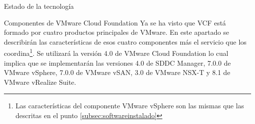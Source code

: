 \begin{section}{Estado de la tecnología}
\begin{subsection}{Componentes de VMware Cloud Foundation \cite{componentesCloudFound}}
Ya se ha visto que VCF está formado por cuatro productos principales de VMware. En este apartado se describirán las características de esos cuatro componentes más el servicio que los coordina\footnote{Las características del componente VMware vSphere son las mismas que las descritas en el punto \ref*{subsec:softwareinstalado}}. Se utilizará la versión 4.0 de VMware Cloud Foundation lo cual implica que se implementarán las versiones 4.0 de SDDC Manager, 7.0.0 de VMware vSphere, 7.0.0 de VMware vSAN, 3.0 de VMware NSX-T y 8.1 de VMware vRealize Suite.

\end{subsection}
\end{section}
